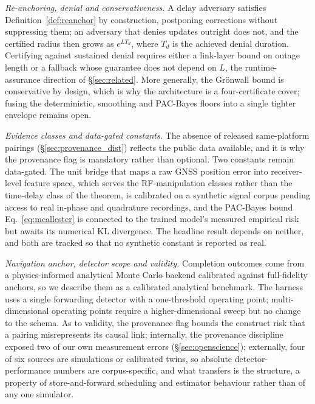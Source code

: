 \emph{Re-anchoring, denial and conservativeness.} A delay adversary satisfies
Definition~\ref{def:reanchor} by construction, postponing corrections without
suppressing them; an adversary that denies updates outright does not, and the
certified radius then grows as $e^{LT_d}$, where $T_d$ is the achieved denial
duration. Certifying against sustained denial requires either a link-layer
bound on outage length or a fallback whose guarantee does not depend on $L$,
the runtime-assurance direction of \S\ref{sec:related}. More generally, the
Gr\"onwall bound is conservative by design, which is why the architecture is a
four-certificate cover; fusing the deterministic, smoothing and PAC-Bayes floors
into a single tighter envelope remains open.

\emph{Evidence classes and data-gated constants.} The absence of released
same-platform pairings (\S\ref{sec:provenance_dist}) reflects the public data
available, and it is why the provenance flag is mandatory rather than optional.
Two constants remain data-gated. The unit bridge that maps a raw GNSS position
error into receiver-level feature space, which serves the RF-manipulation
classes rather than the time-delay class of the theorem, is calibrated on a
synthetic signal corpus pending access to real in-phase and quadrature
recordings, and the PAC-Bayes bound Eq.~\eqref{eq:mcallester} is connected to
the trained model's measured empirical risk but awaits its numerical KL
divergence. The headline result depends on neither, and both are tracked so
that no synthetic constant is reported as real.

\emph{Navigation anchor, detector scope and validity.} Completion outcomes come
from a physics-informed analytical Monte Carlo backend calibrated against
full-fidelity anchors, so we describe them as a calibrated analytical
benchmark. The harness uses a single forwarding detector with a one-threshold
operating point; multi-dimensional operating points require a
higher-dimensional sweep but no change to the schema. As to validity, the
provenance flag bounds the construct risk that a pairing misrepresents its
causal link; internally, the provenance discipline exposed two of our own
measurement errors (\S\ref{sec:openscience}); externally, four of six sources are simulations or calibrated twins, so absolute
detector-performance numbers are corpus-specific, and what transfers is the
structure, a property of store-and-forward scheduling and estimator behaviour
rather than of any one simulator.

